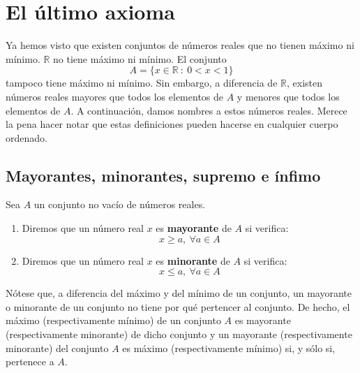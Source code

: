\chapter{El último axioma}
    
Ya hemos visto que existen conjuntos de números reales que no tienen máximo ni mínimo. $\mathbb{R}$ no tiene máximo ni mínimo. El conjunto
\begin{equation*}
    A=\{x \in \mathbb{R} ~:~ 0 < x < 1\}
\end{equation*}
tampoco tiene máximo ni mínimo. Sin embargo, a diferencia de $\mathbb{R}$, existen números reales mayores que todos los elementos de $A$ y menores que todos los elementos de $A$. A continuación, damos nombres a estos números reales. Merece la pena hacer notar que estas definiciones pueden hacerse en cualquier cuerpo ordenado.


\section{Mayorantes, minorantes, supremo e ínfimo}
\begin{definicion}
    Sea $A$ un conjunto no vacío de números reales.
    \begin{enumerate}
        \item Diremos que un número real $x$ es \textbf{mayorante} de $A$ si verifica:
        \begin{equation*}
            x \geq a,~\forall a \in A
        \end{equation*}

        \item Diremos que un número real $x$ es \textbf{minorante} de $A$ si verifica:
        \begin{equation*}
            x \leq a,~\forall a \in A
        \end{equation*}
    \end{enumerate}
\end{definicion}

Nótese que, a diferencia del máximo y del mínimo de un conjunto, un mayorante o minorante de un conjunto no tiene por qué pertencer al conjunto. De hecho, el máximo (respectivamente mínimo) de un conjunto $A$ es mayorante (respectivamente minorante) de dicho conjunto y un mayorante (respectivamente minorante) del conjunto $A$ es máximo (respectivamente mínimo) si, y sólo si, pertenece a $A$.\\

